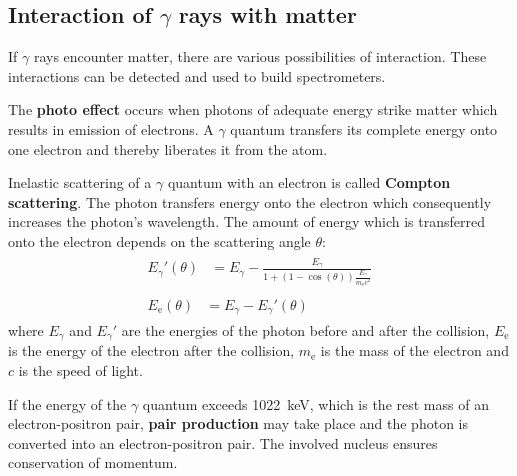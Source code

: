 \subsection*{Interaction of $\gamma$ rays with matter}
If $\gamma$ rays encounter matter, there are various possibilities of interaction. These interactions can be detected and used to build spectrometers.
%
\par
%
The \textbf{photo effect} occurs when photons of adequate energy strike matter which results in emission of electrons.
A $\gamma$ quantum transfers its complete energy onto one electron and thereby liberates it from the atom.
%
\par
%
Inelastic scattering of a $\gamma$ quantum with an electron is called \textbf{Compton scattering}.
The photon transfers energy onto the electron which consequently increases the photon's wavelength.
The amount of energy which is transferred onto the electron depends on the scattering angle $\theta$:
\begin{align}
    \label{eq:PhotonNachStoss}
    \begin{split}
        {E_{\gamma}}'(\theta) &= E_{\gamma} - \frac{E_{\gamma}}{1 + \left ( 1 - \cos(\theta) \right ) \frac{E_{\gamma}}{m_{\text{e}} c^2}}
    \end{split}
    \\
    \label{eq:ElektronNachStoss}
    \begin{split}
        E_{\text{e}}(\theta) &= E_{\gamma} - {E_{\gamma}}'(\theta)
    \end{split}
\end{align}
where $E_{\gamma}$ and ${E_{\gamma}}'$ are the energies of the photon before and after the collision, $E_{\text{e}}$ is the energy of the electron after the collision, $m_{\text{e}}$ is the mass of the electron and $c$ is the speed of light. \cite{AnleitungZusatz2}
%
\par
%
If the energy of the $\gamma$ quantum exceeds \SI{1022}{\kilo\electronvolt}, which is the rest mass of an electron-positron pair, \textbf{pair production} may take place and the photon is converted into an electron-positron pair.
The involved nucleus ensures conservation of momentum.
\cite{AnleitungZusatz1}
%
